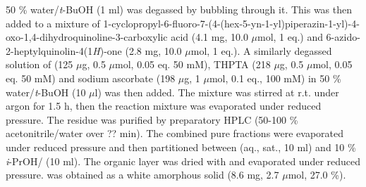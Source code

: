 {{{{{{{{{{{{{{{{{{{{{{{50 \% water/\textit{t}-BuOH (1 ml) was degassed by bubbling  through it. This was then added to a mixture of 1-cyclopropyl-6-fluoro-7-(4-(hex-5-yn-1-yl)piperazin-1-yl)-4-oxo-1,4\hyp{}dihydro\-quinoline-3-carboxylic acid  (4.1 mg, 10.0 $\mu$mol, 1 eq.) and 6-azido-2-heptylquinolin-4(1\textit{H})-one  (2.8 mg, 10.0 $\mu$mol, 1 eq.).
A similarly degassed solution of  (125 $\mu$g, 0.5 $\mu$mol, 0.05 eq. 50 mM), THPTA (218 $\mu$g, 0.5 $\mu$mol, 0.05 eq. 50 mM) and sodium ascorbate (198 $\mu$g, 1 $\mu$mol, 0.1 eq., 100 mM) in 50 \% water/\textit{t}-BuOH (10 $\mu$l) was then added. 
The mixture was stirred at r.t. under argon for 1.5 h, then the reaction mixture was evaporated under reduced pressure. The residue was purified by preparatory HPLC (50-100 \% acetonitrile/water over ?? min). 
The combined pure fractions were evaporated under reduced pressure and then partitioned between  (aq., sat., 10 ml) and 10 \% \textit{i}-PrOH/ (10 ml). The organic layer was dried with  and evaporated under reduced pressure.
 was obtained as a white amorphous solid (8.6 mg, 2.7 $\mu$mol, 27.0 \%). %
\\[1\baselineskip]
}}}}}}}}}}}}}}}}}}}}}}}
